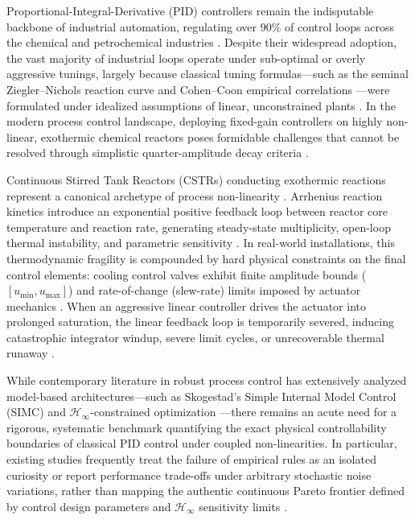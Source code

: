 
Proportional-Integral-Derivative (PID) controllers remain the indisputable backbone of industrial automation, regulating over $90\%$ of control loops across the chemical and petrochemical industries \cite{astrom2006pid, seborg2010process}. Despite their widespread adoption, the vast majority of industrial loops operate under sub-optimal or overly aggressive tunings, largely because classical tuning formulas—such as the seminal Ziegler--Nichols reaction curve \cite{ziegler1942optimum} and Cohen--Coon empirical correlations \cite{cohen1953theoretical}—were formulated under idealized assumptions of linear, unconstrained plants \cite{odwyer2009handbook, shinskey1996process}. In the modern process control landscape, deploying fixed-gain controllers on highly non-linear, exothermic chemical reactors poses formidable challenges that cannot be resolved through simplistic quarter-amplitude decay criteria \cite{visioli2006practical, luyben2007chemical}.

Continuous Stirred Tank Reactors (CSTRs) conducting exothermic reactions represent a canonical archetype of process non-linearity \cite{uppal1974dynamic, aris1958analysis}. Arrhenius reaction kinetics introduce an exponential positive feedback loop between reactor core temperature and reaction rate, generating steady-state multiplicity, open-loop thermal instability, and parametric sensitivity \cite{bequette2003process, rawlings2020model}. In real-world installations, this thermodynamic fragility is compounded by hard physical constraints on the final control elements: cooling control valves exhibit finite amplitude bounds ($[u_{\min}, u_{\max}]$) and rate-of-change (slew-rate) limits imposed by actuator mechanics \cite{hippe2006windup, tarbouriech2009antiwindup}. When an aggressive linear controller drives the actuator into prolonged saturation, the linear feedback loop is temporarily severed, inducing catastrophic integrator windup, severe limit cycles, or unrecoverable thermal runaway \cite{bohn1995analysis, peng1996nonlinear}.

While contemporary literature in robust process control has extensively analyzed model-based architectures—such as Skogestad's Simple Internal Model Control (SIMC) \cite{skogestad2003simple, grimholt2018optimal} and $\mathcal{H}_\infty$-constrained optimization \cite{garpinger2014performance, padula2012optimal}—there remains an acute need for a rigorous, systematic benchmark quantifying the exact physical controllability boundaries of classical PID control under coupled non-linearities. In particular, existing studies frequently treat the failure of empirical rules as an isolated curiosity or report performance trade-offs under arbitrary stochastic noise variations, rather than mapping the authentic continuous Pareto frontier defined by control design parameters and $\mathcal{H}_\infty$ sensitivity limits \cite{alcantara2013simple, reynoso2021multiobjective}.


